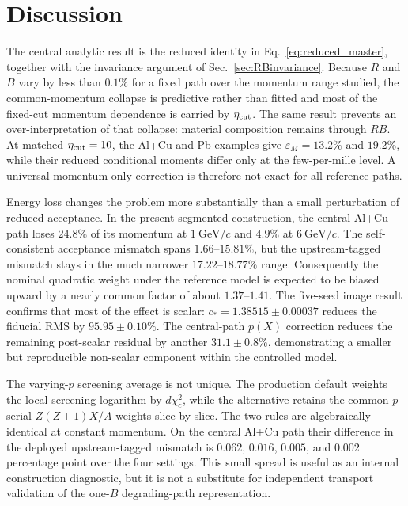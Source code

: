 \documentclass[aps,pra,reprint,longbibliography,floatfix]{revtex4-2}
\newcommand{\epsM}{\ensuremath{\varepsilon_M}}
\begin{document}
\section{Discussion}\label{sec:discussion}
The central analytic result is the reduced identity in Eq.~\eqref{eq:reduced_master}, together with the invariance argument of Sec.~\ref{sec:RBinvariance}.  Because $R$ and $B$ vary by less than $0.1\%$ for a fixed path over the momentum range studied, the common-momentum collapse is predictive rather than fitted and most of the fixed-cut momentum dependence is carried by $\eta_{\rm cut}$.  The same result prevents an over-interpretation of that collapse: material composition remains through $RB$.  At matched $\eta_{\rm cut}=10$, the Al+Cu and Pb examples give $\epsM=13.2\%$ and $19.2\%$, while their reduced conditional moments differ only at the few-per-mille level.  A universal momentum-only correction is therefore not exact for all reference paths.

Energy loss changes the problem more substantially than a small perturbation of reduced acceptance.  In the present segmented construction, the central Al+Cu path loses $24.8\%$ of its momentum at $1~\mathrm{GeV}/c$ and $4.9\%$ at $6~\mathrm{GeV}/c$.  The self-consistent acceptance mismatch spans $1.66$--$15.81\%$, but the upstream-tagged mismatch stays in the much narrower $17.22$--$18.77\%$ range.  Consequently the nominal quadratic weight under the reference model is expected to be biased upward by a nearly common factor of about $1.37$--$1.41$.  The five-seed image result confirms that most of the effect is scalar: $c_*=1.38515\pm0.00037$ reduces the fiducial RMS by $95.95\pm0.10\%$.  The central-path $p(X)$ correction reduces the remaining post-scalar residual by another $31.1\pm0.8\%$, demonstrating a smaller but reproducible non-scalar component within the controlled model.

The varying-$p$ screening average is not unique.  The production default weights the local screening logarithm by $d\chi_c^2$, while the alternative retains the common-$p$ serial $Z(Z+1)X/A$ weights slice by slice.  The two rules are algebraically identical at constant momentum.  On the central Al+Cu path their difference in the deployed upstream-tagged mismatch is $0.062$, $0.016$, $0.005$, and $0.002$ percentage point over the four settings.  This small spread is useful as an internal construction diagnostic, but it is not a substitute for independent transport validation of the one-$B$ degrading-path representation.
\end{document}
